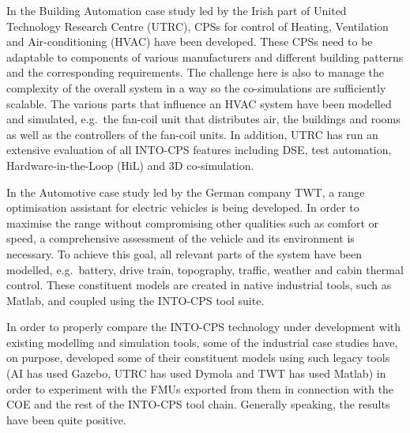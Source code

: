 In the Building Automation case study led by the Irish part of United Technology Research Centre (UTRC), CPSs for control of Heating, Ventilation and Air-conditioning (HVAC) have been developed. These CPSs need to be adaptable to components of various manufacturers and different building patterns and the corresponding requirements. The challenge here is also to manage the complexity of the overall system in a way so the co-simulations are sufficiently scalable. The various parts that influence an HVAC system have been modelled and simulated, e.g.\ the fan-coil unit that distributes air, the buildings and rooms as well as the controllers of the fan-coil units.
In addition, UTRC has run an extensive evaluation of all INTO-CPS features including DSE, test automation, Hardware-in-the-Loop (HiL) and 3D co-simulation.

In the Automotive case study led by the German company TWT, a range optimisation assistant for electric vehicles is being developed. In order to maximise the range without compromising other qualities such as comfort or speed, a comprehensive assessment of the vehicle and its environment is necessary. To achieve this goal, all relevant parts of the system have been modelled, e.g.\ battery, drive train, topography, traffic, weather and cabin thermal control. These constituent models are created in native industrial tools, such as Matlab, and coupled using the INTO-CPS tool suite.

In order to properly compare the INTO-CPS technology under development with existing modelling and simulation tools, some of the industrial case studies have, on purpose, developed some of their constituent models using such legacy tools (AI has used Gazebo, UTRC has used Dymola and TWT has used Matlab) in order to experiment with the FMUs exported from them in connection with the COE and the rest of the INTO-CPS tool chain. Generally speaking, the results have been quite positive.

